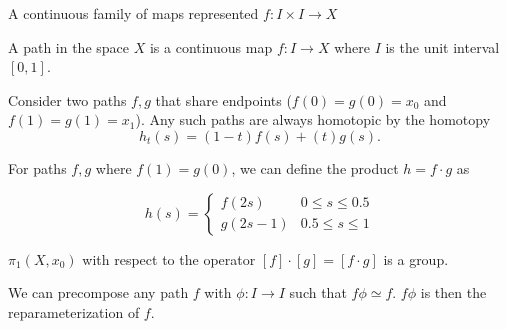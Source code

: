 \documentclass[10pt]{article}
\begin{document}
\begin{definition}

A continuous family of maps represented $f: I \times I \to X$ 

A path in the space $X$ is a continuous map $f: I \to X$ where $I$ is the unit
interval $[0, 1]$.
\end{definition}

\begin{example}
Consider two paths $f, g$ that share endpoints ($f(0) = g(0) = x_0$ and $f(1) =
g(1) = x_1$). Any such paths are always homotopic by the homotopy 
\[
h_t(s) = (1-t)f(s) + (t)g(s).
\]


\end{example}


\begin{proposition}
\end{proposition}

\begin{definition}

	For paths $f, g$ where $f(1) = g(0)$, we can define the product $h = f \cdot g$ as

\[ h(s) = \begin{cases} 
      f(2s) & 0 \leq s \leq 0.5 \\
      g(2s-1) & 0.5 \leq s \leq 1
   \end{cases}
\]

\end{definition}


\begin{proposition}
	$\pi_1(X, x_0)$ with respect to the operator $[f]\cdot[g] = [f\cdot g]$ is a group.
\end{proposition}

\begin{definition}
	We can precompose any path $f$ with $\phi: I \to I$ such that $f\phi \simeq f$. $f\phi$ is then the reparameterization of $f$.
\end{definition}
\end{document}
